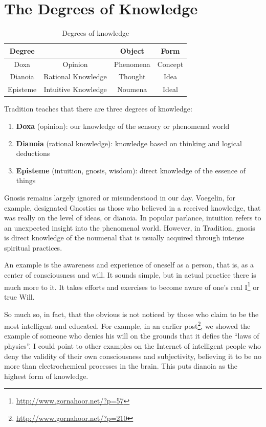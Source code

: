 \section{The Degrees of Knowledge}

\begin{table}[h]\centering\small
\begin{tabular}{cccc}\toprule
\textbf{Degree} & ~ & \textbf{Object} & \textbf{Form} \\\midrule
Doxa & Opinion & Phenomena & Concept \\ Dianoia & Rational Knowledge & Thought & Idea \\ Episteme & Intuitive Knowledge & Noumena & Ideal \\\bottomrule
\end{tabular}
\caption{Degrees of knowledge}
\end{table}

Tradition teaches that there are three degrees of knowledge:

\begin{enumerate}

\item \textbf{Doxa} (opinion): our knowledge of the sensory or phenomenal world
\item \textbf{Dianoia} (rational knowledge): knowledge based on thinking and logical deductions
\item \textbf{Episteme} (intuition, gnosis, wisdom): direct knowledge of the essence of things
\end{enumerate}


Gnosis remains largely ignored or misunderstood in our day. Voegelin, for example, designated Gnostics as those who believed in a received knowledge, that was really on the level of ideas, or dianoia. In popular parlance, intuition refers to an unexpected insight into the phenomenal world. However, in Tradition, gnosis is direct knowledge of the noumenal that is usually acquired through intense spiritual practices.

An example is the awareness and experience of oneself as a person, that is, as a center of consciousness and will. It sounds simple, but in actual practice there is much more to it. It takes efforts and exercises to become aware of one's real I\footnote{\url{http://www.gornahoor.net/?p=57}} or true Will.

So much so, in fact, that the obvious is not noticed by those who claim to be the most intelligent and educated. For example, in an earlier post\footnote{\url{http://www.gornahoor.net/?p=210}}, we showed the example of someone who denies his will on the grounds that it defies the ``laws of physics''. I could point to other examples on the Internet of intelligent people who deny the validity of their own consciousness and subjectivity, believing it to be no more than electrochemical processes in the brain. This puts dianoia as the highest form of knowledge.

